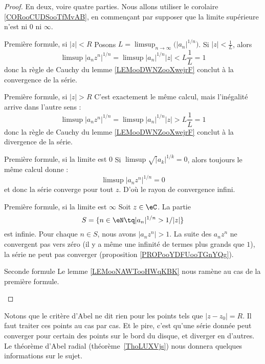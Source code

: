 \begin{proof}
	En deux, voire quatre parties. Nous allons utiliser le corolaire \ref{CORooCUDSooTfMvAB}, en commençant par supposer que la limite supérieure n'est ni \( 0\) ni \( \infty\).
	\begin{subproof}
		\item[Première formule, si \( | z |<R\)]
		Posons \( L=\limsup_{n\to \infty}\big( | a_n |^{1/n} \big)\). Si \( | z |<\frac{1}{ L }\), alors
		\begin{equation}
			\limsup| a_nz^n |^{1/n}= \limsup| a_n |^{1/n}| z |
			<L\frac{1}{ L }
			=1
		\end{equation}
		donc la règle de Cauchy du lemme \ref{LEMooDWNZooXwejrF} conclut à la convergence de la série.
		\item[Première formule, si \( | z |>R\)]
		C'est exactement le même calcul, mais l'inégalité arrive dans l'autre sens :
		\begin{equation}
			\limsup| a_nz^n |^{1/n}= \limsup| a_n |^{1/n}| z |
			>L\frac{1}{ L }
			=1
		\end{equation}
		donc la règle de Cauchy du lemme \ref{LEMooDWNZooXwejrF} conclut à la divergence de la série.
		\item[Première formule, si la limite est \( 0\)]
		Si \( \limsup\sqrt| a_k |^{1/k}=0\), alors toujours le même calcul donne :
		\begin{equation}
			\limsup| a_nz^n |^{1/n}=0
		\end{equation}
		et donc la série converge pour tout \( z\). D'où le rayon de convergence infini.
		\item[Première formule, si la limite est \( \infty\)]
		Soit \( z\in \eC\). La partie
		\begin{equation}
			S=\{ n\in \eN\tq | a_n |^{1/n}>1/| z | \}
		\end{equation}
		est infinie. Pour chaque \( n\in S\), nous avons \( | a_n z^n |>1\). La suite des \( a_nz^n\) ne convergent pas vers zéro (il y a même une infinité de termes plus grands que \( 1\)), la série ne peut pas converger (proposition \ref{PROPooYDFUooTGnYQg}).
		\item[Seconde formule]
		Le lemme \ref{LEMooNAWTooHWqKBK} nous ramène au cas de la première formule.
	\end{subproof}
\end{proof}

Notons que le critère d'Abel ne dit rien pour les points tels que $| z-z_0 |=R$. Il faut traiter ces points au cas par cas. Et le pire, c'est qu'une série donnée peut converger pour certain des points sur le bord du disque, et diverger en d'autres. Le théorème d'Abel radial (théorème~\ref{ThoLUXVjs}) nous donnera quelques informations sur le sujet.

